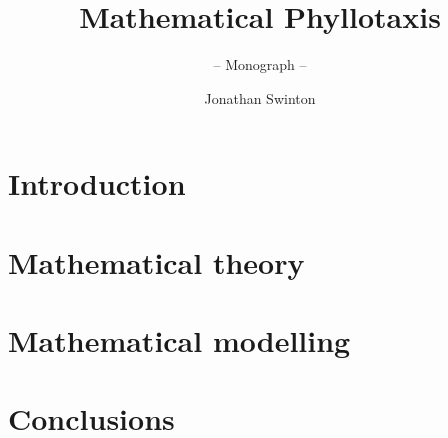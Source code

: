 \documentclass[graybox,envcountchap,sectrefs]{svmono}
\begin{document}
	\listoftodos



\author{Jonathan Swinton}
\title{Mathematical Phyllotaxis}
\subtitle{-- Monograph --}
\maketitle

\frontmatter%


%


%

\tableofcontents

\mainmatter%


\part{Introduction}



\part{Mathematical theory}




\part{Mathematical modelling}





\part{Conclusions}



\backmatter%


\end{document}
